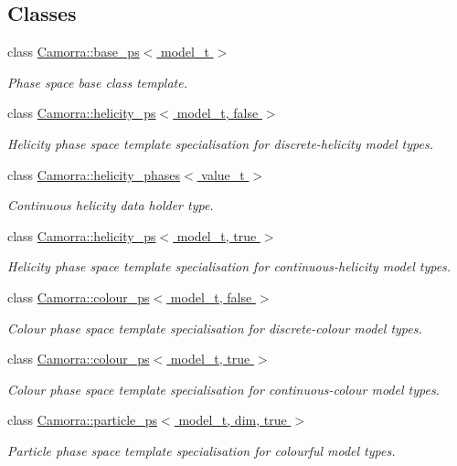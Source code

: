 \subsection*{Classes}
\begin{DoxyCompactItemize}
\item 
class \hyperlink{a00021}{Camorra::base\_\-ps$<$ model\_\-t $>$}
\begin{DoxyCompactList}\small\item\em Phase space base class template. \end{DoxyCompactList}\item 
class \hyperlink{a00259}{Camorra::helicity\_\-ps$<$ model\_\-t, false $>$}
\begin{DoxyCompactList}\small\item\em Helicity phase space template specialisation for discrete-\/helicity model types. \end{DoxyCompactList}\item 
class \hyperlink{a00258}{Camorra::helicity\_\-phases$<$ value\_\-t $>$}
\begin{DoxyCompactList}\small\item\em Continuous helicity data holder type. \end{DoxyCompactList}\item 
class \hyperlink{a00260}{Camorra::helicity\_\-ps$<$ model\_\-t, true $>$}
\begin{DoxyCompactList}\small\item\em Helicity phase space template specialisation for continuous-\/helicity model types. \end{DoxyCompactList}\item 
class \hyperlink{a00084}{Camorra::colour\_\-ps$<$ model\_\-t, false $>$}
\begin{DoxyCompactList}\small\item\em Colour phase space template specialisation for discrete-\/colour model types. \end{DoxyCompactList}\item 
class \hyperlink{a00085}{Camorra::colour\_\-ps$<$ model\_\-t, true $>$}
\begin{DoxyCompactList}\small\item\em Colour phase space template specialisation for continuous-\/colour model types. \end{DoxyCompactList}\item 
class \hyperlink{a00399}{Camorra::particle\_\-ps$<$ model\_\-t, dim, true $>$}
\begin{DoxyCompactList}\small\item\em Particle phase space template specialisation for colourful model types. \end{DoxyCompactList}\item 

\end{DoxyCompactItemize}
